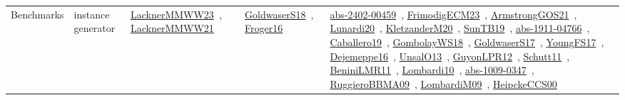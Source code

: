 {\begin{longtable}{lp{3cm}>{\raggedright\arraybackslash}p{6cm}>{\raggedright\arraybackslash}p{6cm}>{\raggedright\arraybackslash}p{8cm}}
\index{instance generator}\index{Benchmarks!instance generator}Benchmarks & instance generator & \href{../works/LacknerMMWW23.pdf}{LacknerMMWW23}~\cite{LacknerMMWW23}, \href{../works/LacknerMMWW21.pdf}{LacknerMMWW21}~\cite{LacknerMMWW21} & \href{../works/GoldwaserS18.pdf}{GoldwaserS18}~\cite{GoldwaserS18}, \href{../works/Froger16.pdf}{Froger16}~\cite{Froger16} & \href{../works/abs-2402-00459.pdf}{abs-2402-00459}~\cite{abs-2402-00459}, \href{../works/FrimodigECM23.pdf}{FrimodigECM23}~\cite{FrimodigECM23}, \href{../works/ArmstrongGOS21.pdf}{ArmstrongGOS21}~\cite{ArmstrongGOS21}, \href{../works/Lunardi20.pdf}{Lunardi20}~\cite{Lunardi20}, \href{../works/KletzanderM20.pdf}{KletzanderM20}~\cite{KletzanderM20}, \href{../works/SunTB19.pdf}{SunTB19}~\cite{SunTB19}, \href{../works/abs-1911-04766.pdf}{abs-1911-04766}~\cite{abs-1911-04766}, \href{../works/Caballero19.pdf}{Caballero19}~\cite{Caballero19}, \href{../works/GombolayWS18.pdf}{GombolayWS18}~\cite{GombolayWS18}, \href{../works/GoldwaserS17.pdf}{GoldwaserS17}~\cite{GoldwaserS17}, \href{../works/YoungFS17.pdf}{YoungFS17}~\cite{YoungFS17}, \href{../works/Dejemeppe16.pdf}{Dejemeppe16}~\cite{Dejemeppe16}, \href{../works/UnsalO13.pdf}{UnsalO13}~\cite{UnsalO13}, \href{../works/GuyonLPR12.pdf}{GuyonLPR12}~\cite{GuyonLPR12}, \href{../works/Schutt11.pdf}{Schutt11}~\cite{Schutt11}, \href{../works/BeniniLMR11.pdf}{BeniniLMR11}~\cite{BeniniLMR11}, \href{../works/Lombardi10.pdf}{Lombardi10}~\cite{Lombardi10}, \href{../works/abs-1009-0347.pdf}{abs-1009-0347}~\cite{abs-1009-0347}, \href{../works/RuggieroBBMA09.pdf}{RuggieroBBMA09}~\cite{RuggieroBBMA09}, \href{../works/LombardiM09.pdf}{LombardiM09}~\cite{LombardiM09}, \href{../works/HeipckeCCS00.pdf}{HeipckeCCS00}~\cite{HeipckeCCS00}\\

\end{longtable}}
